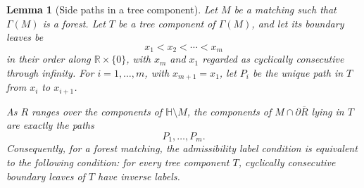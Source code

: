 \documentclass[12pt]{article}
\newcommand{\RR}{\mathbb{R}}
\newcommand{\HH}{\mathbb{H}}
\newcommand{\bd}{\partial}
\newtheorem{lemma}[theorem]{Lemma}
\theoremstyle{definition}
\begin{document}
\begin{lemma}[Side paths in a tree component]\label{lem:sidepaths}
Let \(M\) be a matching such that \(\Gamma(M)\) is a forest.  Let \(T\) be a tree component of \(\Gamma(M)\), and let its boundary leaves be
\[
x_1<x_2<\cdots <x_m
\]
in their order along \(\RR\times\{0\}\), with \(x_m\) and \(x_1\) regarded as cyclically consecutive through infinity.  For \(i=1,\dots,m\), with \(x_{m+1}=x_1\), let \(P_i\) be the unique path in \(T\) from \(x_i\) to \(x_{i+1}\).

As \(R\) ranges over the components of \(\HH\setminus M\), the components of \(M\cap\bd\overline R\) lying in \(T\) are exactly the paths
\[
P_1,\dots,P_m.
\]
Consequently, for a forest matching, the admissibility label condition is equivalent to the following condition: for every tree component \(T\), cyclically consecutive boundary leaves of \(T\) have inverse labels.
\end{lemma}
\end{document}
